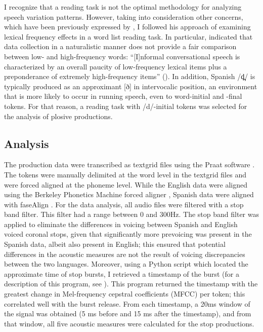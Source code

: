 \documentclass[output=paper,colorlinks,citecolor=brown,
]{langscibook}
\begin{document}
I recognize that a reading task is not the optimal methodology for analyzing speech variation patterns. However, taking into consideration other concerns, which have been previously expressed by \citet{file2009role}, I followed his approach of examining lexical frequency effects in a word list reading task. In particular, \citeauthor{file2009role} indicated that data collection in a naturalistic manner does not provide a fair comparison between low- and high-frequency words: ``[I]nformal conversational speech is characterized by an overall paucity of low-frequency lexical items plus a preponderance of extremely high-frequency items'' (\citeyear[350]{file2009role}). In addition, Spanish /d̪/ is typically produced as an approximant [ð] in intervocalic position, an environment that is more likely to occur in running speech, even to word-initial and -final tokens. For that reason, a reading task with /d/-initial tokens was selected for the analysis of plosive productions.

\subsection{Analysis}

The production data were transcribed as textgrid files using the Praat software \citep{Boersma2009}. The tokens were manually delimited at the word level in the textgrid files and were forced aligned at the phoneme level. While the English data were aligned using the Berkeley Phonetics Machine forced aligner \citep{sprouse2016berkeley}, Spanish data were aligned with faseAlign \citep{wilbanks2018fasealign}. For the data analysis, all audio files were filtered with a stop band filter. This filter had a range between 0 and 300Hz. The stop band filter was applied to eliminate the differences in voicing between Spanish and English voiced coronal stops, given that significantly more prevoicing was present in the Spanish data, albeit also present in English; this ensured that potential differences in the acoustic measures are not the result of voicing discrepancies between the two languages. Moreover, using a Python script which located the approximate time of stop bursts, I retrieved a timestamp of the burst (for a description of this program, see \citealt{lin2019burst}). This program returned the timestamp with the greatest change in Mel-frequency cepstral coefficients (MFCC) per token; this correlated well with the burst release. From each timestamp, a 20ms window of the signal was obtained (5 ms before and 15 ms after the timestamp), and from that window, all five acoustic measures were calculated for the stop productions.
\end{document}
